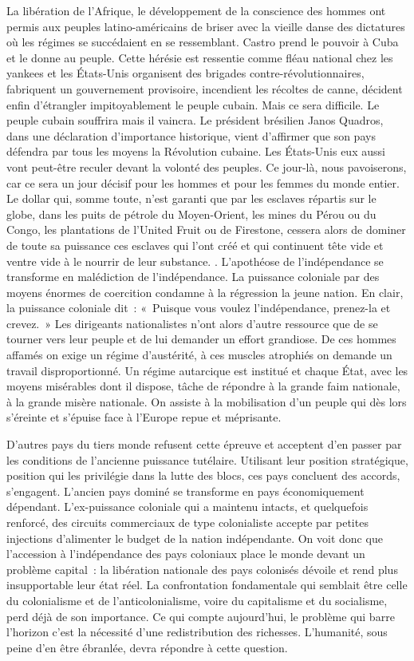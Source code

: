 \documentclass[french,twoside]{book} %
\begin{document}
{ La libération de l’Afrique, le développement de la conscience des hommes ont permis aux peuples latino-américains de briser avec la vieille danse des dictatures où les régimes se succédaient en se ressemblant. Castro prend le pouvoir à Cuba et le donne au peuple. Cette hérésie est ressentie comme fléau national chez les yankees et les États-Unis organisent des brigades contre-révolutionnaires, fabriquent un gouvernement provisoire, incendient les récoltes de canne, décident enfin d’étrangler impitoyablement le peuple cubain. Mais ce sera difficile. Le peuple cubain souffrira mais il vaincra. Le président brésilien Janos Quadros, dans une déclaration d’importance historique, vient d’affirmer que son pays défendra par tous les moyens la Révolution cubaine. Les États-Unis eux aussi vont peut-être reculer devant la volonté des peuples. Ce jour-là, nous pavoiserons, car ce sera un jour décisif pour les hommes et pour les femmes du monde entier. Le dollar qui, somme toute, n’est garanti que par les esclaves répartis sur le globe, dans les puits de pétrole du Moyen-Orient, les mines du Pérou ou du Congo, les plantations de l’United Fruit ou de Firestone, cessera alors de dominer de toute sa puissance ces esclaves qui l’ont créé et qui continuent tête vide et ventre vide à le nourrir de leur substance.
}. L’apothéose de l’indépendance se transforme en malédiction de l’indépendance. La puissance coloniale par des moyens énormes de coercition condamne à la régression la jeune nation. En clair, la puissance coloniale dit : « Puisque vous voulez l’indépendance, prenez-la et crevez. » Les dirigeants nationalistes n’ont alors d’autre ressource que de se tourner vers leur peuple et de lui demander un effort grandiose. De ces hommes affamés on exige un régime d’austérité, à ces muscles atrophiés on demande un travail disproportionné. Un régime autarcique est institué et chaque État, avec les moyens misérables dont il dispose, tâche de répondre à la grande faim nationale, à la grande misère nationale. On assiste à la mobilisation d’un peuple qui dès lors s’éreinte et s’épuise face à l’Europe repue et méprisante.\par
 D’autres pays du tiers monde refusent cette épreuve et acceptent d’en passer par les conditions de l’ancienne puissance tutélaire. Utilisant leur position stratégique, position qui les privilégie dans la lutte des blocs, ces pays concluent des accords, s’engagent. L’ancien pays dominé se transforme en pays économiquement dépendant. L’ex-puissance coloniale qui a maintenu intacts, et quelquefois renforcé, des circuits commerciaux de type colonialiste accepte par petites injections d’alimenter le budget de la nation indépendante. On voit donc que l’accession à l’indépendance des pays coloniaux place le monde devant un problème capital : la libération nationale des pays colonisés dévoile et rend plus insupportable leur état réel. La confrontation fondamentale qui semblait être celle du colonialisme et de l’anticolonialisme, voire du capitalisme et du socialisme, perd déjà de son importance. Ce qui compte aujourd’hui, le problème qui barre l’horizon c’est la nécessité d’une redistribution des richesses. L’humanité, sous peine d’en être ébranlée, devra répondre à cette question.\par
\end{document}
